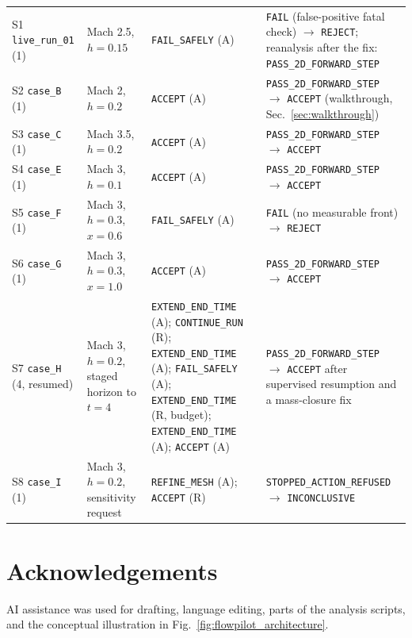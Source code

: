 \documentclass[11pt]{article}
\begin{document}
\begin{table}[!htbp]
\begin{tabularx}{\linewidth}{@{}>{\raggedright\arraybackslash}p{2.6cm}
  >{\raggedright\arraybackslash}p{3.1cm} >{\raggedright\arraybackslash}X
  >{\raggedright\arraybackslash}p{3.3cm}@{}}
S1 \texttt{live\_run\_01} (1) & Mach 2.5, $h=0.15$ & \texttt{FAIL\_SAFELY} (A) & \texttt{FAIL} (false-positive fatal check) $\rightarrow$ \texttt{REJECT}; reanalysis after the fix: \texttt{PASS\_2D\_FORWARD\_STEP} \\
S2 \texttt{case\_B} (1) & Mach 2, $h=0.2$ & \texttt{ACCEPT} (A) & \texttt{PASS\_2D\_FORWARD\_STEP} $\rightarrow$ \texttt{ACCEPT} (walkthrough, Sec.~\ref{sec:walkthrough}) \\
S3 \texttt{case\_C} (1) & Mach 3.5, $h=0.2$ & \texttt{ACCEPT} (A) & \texttt{PASS\_2D\_FORWARD\_STEP} $\rightarrow$ \texttt{ACCEPT} \\
S4 \texttt{case\_E} (1) & Mach 3, $h=0.1$ & \texttt{ACCEPT} (A) & \texttt{PASS\_2D\_FORWARD\_STEP} $\rightarrow$ \texttt{ACCEPT} \\
S5 \texttt{case\_F} (1) & Mach 3, $h=0.3$, $x=0.6$ & \texttt{FAIL\_SAFELY} (A) & \texttt{FAIL} (no measurable front) $\rightarrow$ \texttt{REJECT} \\
S6 \texttt{case\_G} (1) & Mach 3, $h=0.3$, $x=1.0$ & \texttt{ACCEPT} (A) & \texttt{PASS\_2D\_FORWARD\_STEP} $\rightarrow$ \texttt{ACCEPT} \\
S7 \texttt{case\_H} (4, resumed) & Mach 3, $h=0.2$, staged horizon to $t=4$ & \texttt{EXTEND\_END\_TIME} (A); \texttt{CONTINUE\_RUN} (R); \texttt{EXTEND\_END\_TIME} (A); \texttt{FAIL\_SAFELY} (A); \texttt{EXTEND\_END\_TIME} (R, budget); \texttt{EXTEND\_END\_TIME} (A); \texttt{ACCEPT} (A) & \texttt{PASS\_2D\_FORWARD\_STEP} $\rightarrow$ \texttt{ACCEPT} after supervised resumption and a mass-closure fix \\
S8 \texttt{case\_I} (1) & Mach 3, $h=0.2$, sensitivity request & \texttt{REFINE\_MESH} (A); \texttt{ACCEPT} (R) & \texttt{STOPPED\_ACTION\_REFUSED} $\rightarrow$ \texttt{INCONCLUSIVE} \\
\bottomrule
\end{tabularx}
\end{table}

\section*{Acknowledgements}
AI assistance was used for drafting, language editing, parts of the analysis scripts, and the conceptual illustration in Fig.~\ref{fig:flowpilot_architecture}.
\end{document}
